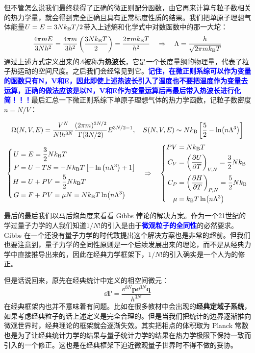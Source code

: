 但不管怎么说我们最终获得了正确的微正则配分函数，由它再来计算与粒子数相关的热力学量，就会得到完全正确且具有正常标度性质的结果。我们把单原子理想气体能量$U=E=3Nk_{\rm B} T/2$带入上述熵和化学式中对数函数中的那一大坨：
\[\frac{4\pi mE}{3Nh^2}=\frac{4\pi m}{3h^2}\left(\frac{3Nk_{\rm B} T}{2}\right)=\frac{2\pi m k_{\rm B} T}{h^2} \quad \Rightarrow \quad \Lambda=\frac{h}{\sqrt{2\pi mk_{\rm B}T}}\]
通过上述方式定义出来的$\Lambda$被称为\textbf{热波长}，它是一个长度量纲的物理量，代表了粒子热运动的空间尺度。之后我们会经常见到它。\textcolor{blue}{\textbf{记住，在微正则系综可以作为变量的函数只有N，V和E，因此即使上述热波长引入了温度也不要把温度作为变量去运算，正确的做法应该是以N，V和E作为变量运算后再最后带入热波长进行化简！！！}}最后汇总一下微正则系综下单原子理想气体的热力学函数，记粒子数密度$n=N/V$：
\begin{theorem}[微正则系综下单原子理想气体的热力学函数]
\[\Omega(N,V,E)=\frac{V^N}{N!h^{3N}}\frac{(2\pi m)^{3N/2}}{\Gamma(3N/2)}E^{3N/2-1}, \quad S(N,V,E) \sim Nk_{\rm B}\left[\frac{5}{2}-\ln(n\Lambda^3)\right]\]
\[\left\{\begin{aligned}
U&=E=\frac{3}{2}Nk_{\rm B} T\\
F&=U-TS=-Nk_{\rm B} T\left[-\ln\left(n\Lambda^3\right)+1\right]\\
H&=U+PV=\frac{5}{2}Nk_{\rm B} T\\
G&=F+PV=\mu N=Nk_{\rm B} T\ln(n\Lambda^3)\\
\end{aligned}\right.
\quad \Rightarrow \quad
\left\{\begin{aligned}
PV&=Nk_{\rm B} T\\
C_V&=\left(\pdv{U}{T}\right)_{V,N}=\frac{3}{2}Nk_{\rm B}\\
C_P&=\left(\pdv{H}{T}\right)_{P,N}=\frac{5}{2}Nk_{\rm B}\\
\mu&=k_{\rm B} T\ln(n\Lambda^3)
\end{aligned}\right.\]
\end{theorem}

最后的最后我们以马后炮角度来看看 Gibbs 悖论的解决方案。作为一个21世纪的学过量子力学的人我们知道$1/N!$的引入是由于\textcolor{blue}{\textbf{微观粒子的全同性}}的必然要求。Gibbs 在一个还没有量子力学的时代敢提出这个解决方案也是非常的超前。但我们也要注意到，量子力学的全同性原则是一个后续发展出来的理论，而不是从经典力学中直接推导出来的，因此在经典力学框架下，$1/N!$的引入确实是一个人为的修正。

但是话说回来，原先在经典统计中定义的相空间微元：
\[\dd{\bm{\Gamma}}=\frac{\dd{^{3N}\bm{p}}\dd{^{3N}\bm{q}}}{h^{3N}}\]
在经典框架内也并不意味着有问题。比如在很多教材中会出现的\textbf{经典定域子系统}，如果考虑经典粒子的话上述定义是完全合理的。但是当我们把统计的边界逐渐推向微观世界时，经典理论的框架就会逐渐失效。其实把相点的体积取为 Planck 常数也是为了让经典统计力学的结果与量子统计力学的结果在热力学极限下保持一致而引入的一个修正。这也是在经典框架下迫近微观量子世界时不得不做的妥协。


